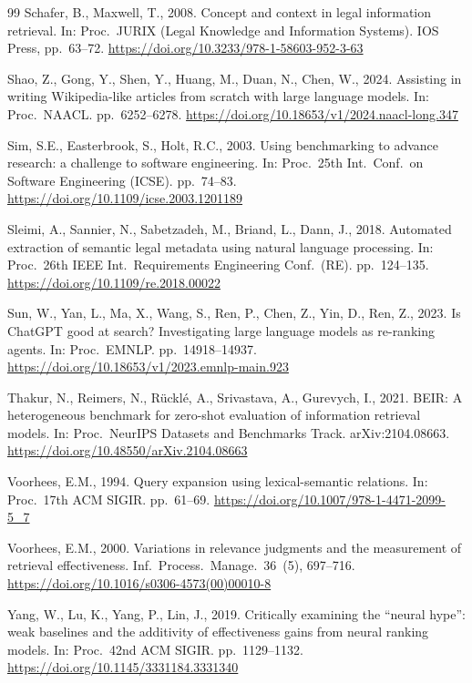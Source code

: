 \documentclass[smallextended,natbib]{svjour3}
\begin{document}
\begin{thebibliography}{99}
Schafer, B., Maxwell, T., 2008. Concept and context in legal information retrieval. In: Proc.\ JURIX (Legal Knowledge and Information Systems). IOS Press, pp.\ 63--72. \url{https://doi.org/10.3233/978-1-58603-952-3-63}

Shao, Z., Gong, Y., Shen, Y., Huang, M., Duan, N., Chen, W., 2024. Assisting in writing Wikipedia-like articles from scratch with large language models. In: Proc.\ NAACL. pp.\ 6252--6278. \url{https://doi.org/10.18653/v1/2024.naacl-long.347}

Sim, S.E., Easterbrook, S., Holt, R.C., 2003. Using benchmarking to advance research: a challenge to software engineering. In: Proc.\ 25th Int.\ Conf.\ on Software Engineering (ICSE). pp.\ 74--83. \url{https://doi.org/10.1109/icse.2003.1201189}

Sleimi, A., Sannier, N., Sabetzadeh, M., Briand, L., Dann, J., 2018. Automated extraction of semantic legal metadata using natural language processing. In: Proc.\ 26th IEEE Int.\ Requirements Engineering Conf.\ (RE). pp.\ 124--135. \url{https://doi.org/10.1109/re.2018.00022}

Sun, W., Yan, L., Ma, X., Wang, S., Ren, P., Chen, Z., Yin, D., Ren, Z., 2023. Is ChatGPT good at search? Investigating large language models as re-ranking agents. In: Proc.\ EMNLP. pp.\ 14918--14937. \url{https://doi.org/10.18653/v1/2023.emnlp-main.923}

Thakur, N., Reimers, N., R\"uckl\'e, A., Srivastava, A., Gurevych, I., 2021. BEIR: A heterogeneous benchmark for zero-shot evaluation of information retrieval models. In: Proc.\ NeurIPS Datasets and Benchmarks Track. arXiv:2104.08663. \url{https://doi.org/10.48550/arXiv.2104.08663}

Voorhees, E.M., 1994. Query expansion using lexical-semantic relations. In: Proc.\ 17th ACM SIGIR. pp.\ 61--69. \url{https://doi.org/10.1007/978-1-4471-2099-5_7}

Voorhees, E.M., 2000. Variations in relevance judgments and the measurement of retrieval effectiveness. Inf.\ Process.\ Manage.\ 36~(5), 697--716. \url{https://doi.org/10.1016/s0306-4573(00)00010-8}

Yang, W., Lu, K., Yang, P., Lin, J., 2019. Critically examining the ``neural hype'': weak baselines and the additivity of effectiveness gains from neural ranking models. In: Proc.\ 42nd ACM SIGIR. pp.\ 1129--1132. \url{https://doi.org/10.1145/3331184.3331340}


\end{thebibliography}
\end{document}
